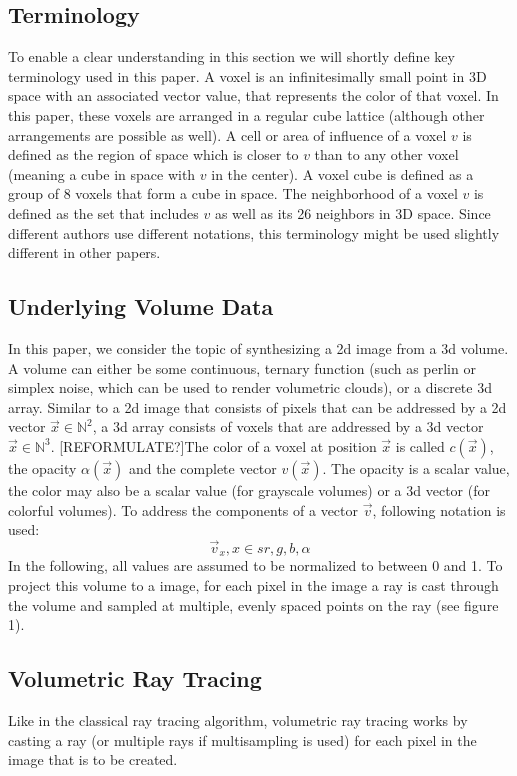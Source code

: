 \subsection{Terminology}
To enable a clear understanding in this section we will shortly define key terminology used in this paper. A voxel is an infinitesimally small point in 3D space with an associated vector value, that represents the color of that voxel. In this paper, these voxels are arranged in a regular cube lattice (although other arrangements are possible as well). A cell or area of influence of a voxel $v$ is defined as the region of space which is closer to $v$ than to any other voxel (meaning a cube in space with $v$ in the center). A voxel cube is defined as a group of 8 voxels that form a cube in space. The neighborhood of a voxel $v$ is defined as the set that includes $v$ as well as its 26 neighbors in 3D space. Since different authors use different notations, this terminology might be used slightly different in other papers.
\subsection{Underlying Volume Data}
In this paper, we consider the topic of synthesizing a 2d image from a 3d volume.
A volume can either be some continuous, ternary function (such as perlin or simplex noise\cite{10.1145/325165.325247}, which can be used to render volumetric clouds\cite{haggstrom2018real}), or a discrete 3d array\cite{511}.
Similar to a 2d image that consists of pixels that can be addressed by a 2d vector $\vec{x} \in \mathbb{N}^2$, a 3d array consists of voxels that are addressed by a 3d vector $\vec{x} \in \mathbb{N}^3$. [REFORMULATE?]The color of a voxel at position $\vec{x}$ is called $c(\vec{x})$, the opacity $\alpha(\vec{x})$ and the complete vector $v(\vec{x})$. The opacity is a scalar value, the color may also be a scalar value (for grayscale volumes) or a 3d vector (for colorful volumes).
To address the components of a vector $\vec{v}$, following notation is used:
\begin{equation}
	\vec{v}_{x}, x \in s{r, g, b, \alpha}
\end{equation}
 In the following, all values are assumed to be normalized to between 0 and 1. To project this volume to a image, for each pixel in the image a ray is cast through the volume and sampled at multiple, evenly spaced points on the ray (see figure 1)\cite{10.1145/78964.78965}.

\subsection{Volumetric Ray Tracing}
Like in the classical ray tracing algorithm, volumetric ray tracing works by casting a ray (or multiple rays if multisampling is used) for each pixel in the image that is to be created.


